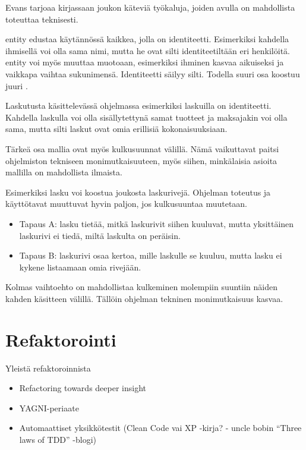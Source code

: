 Evans tarjoaa kirjassaan joukon käteviä työkaluja, joiden avulla
 on mahdollista toteuttaa teknisesti.

\Gls{entity} edustaa käytännössä kaikkea, jolla on identiteetti.
Esimerkiksi kahdella ihmisellä voi olla sama nimi, mutta he ovat silti
identiteetiltään eri henkilöitä. \gls{entity} voi myös muuttaa muotoaan,
esimerkiksi ihminen kasvaa aikuiseksi ja vaikkapa vaihtaa sukunimensä.
Identiteetti säilyy silti. Todella suuri osa
 koostuu juuri
.

Laskutusta käsittelevässä ohjelmassa esimerkiksi laskuilla on
identiteetti. Kahdella laskulla voi olla sisällytettynä samat tuotteet
ja maksajakin voi olla sama, mutta silti laskut ovat omia erillisiä
kokonaisuuksiaan.

Tärkeä osa mallia ovat myös kulkusuunnat 
välillä. Nämä vaikuttavat paitsi ohjelmiston tekniseen
monimutkaisuuteen, myös siihen, minkälaisia asioita mallilla on
mahdollista ilmaista.

Esimerkiksi lasku voi koostua joukosta laskurivejä. Ohjelman toteutus ja
käyttötavat muuttuvat hyvin paljon, jos kulkusuuntaa muutetaan.

\begin{itemize}
\tightlist
\item
  Tapaus A: lasku tietää, mitkä laskurivit siihen kuuluvat, mutta
  yksittäinen laskurivi ei tiedä, miltä laskulta on peräisin.
\item
  Tapaus B: laskurivi osaa kertoa, mille laskulle se kuuluu, mutta lasku
  ei kykene listaamaan omia rivejään.
\end{itemize}

Kolmas vaihtoehto on mahdollistaa kulkeminen molempiin suuntiin näiden
kahden käsitteen välillä. Tällöin ohjelman tekninen monimutkaisuus
kasvaa.

\hypertarget{refaktorointi}{%
\section{Refaktorointi}\label{refaktorointi}}

Yleistä refaktoroinnista

\begin{itemize}
\tightlist
\item
  Refactoring towards deeper insight
\item
  YAGNI-periaate
\item
  Automaattiset yksikkötestit (Clean Code vai XP -kirja? - uncle bobin
  ``Three laws of TDD'' -blogi)
\end{itemize}

